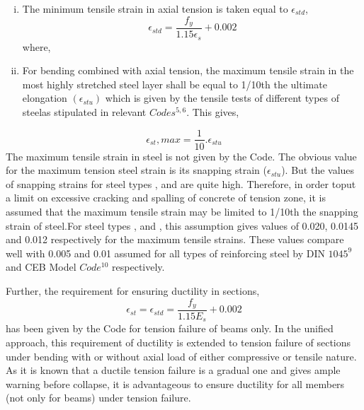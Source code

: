 \begin{enumerate}[(i)]
\item The minimum tensile strain in axial tension is taken equal to
$\epsilon_{std}$,
\begin{equation}
\epsilon_{std}=\frac{f_y}{1.15{\epsilon_s}}+0.002
\label{minimumtensilestrain}
\end{equation}
where, 
\item  For bending combined with axial tension, the maximum tensile
strain in the most highly stretched steel layer shall be equal to 1/10th
the ultimate elongation $(\epsilon_{stu})$ which is given by the tensile
tests of different types of steelas stipulated in relevant
$Codes^{5,6}$. This gives,
\end{enumerate}
\begin{equation}
\epsilon_{st},max=\frac{1}{10}.\epsilon_{stu}
\end{equation}
The maximum tensile strain in steel is not given by the Code. The obvious
value for the maximum tension steel strain is its snapping strain
($\epsilon_{stu}$). But the values of snapping strains for steel types
{\fetwofivezero}, {\fefouronefive} and {\fefivezerozero} are quite high.
Therefore, in order toput a limit on excessive cracking and spalling of
concrete of tension zone, it is assumed that the maximum tensile strain
may be limited to 1/10th the snapping strain of steel.For steel types
{\fetwofivezero}, {\fefouronefive} and {\fefivezerozero}, this assumption
gives values of 0.020, 0.0145 and 0.012 respectively for the maximum
tensile strains. These values compare well with 0.005 and 0.01 assumed for 
all types of reinforcing steel by DIN $1045^9$ and CEB Model $Code^{10}$
respectively.

Further, the requirement for ensuring ductility in sections,
$$\epsilon_{st}=\epsilon_{std}=\frac{f_y}{1.15 E_s}+0.002$$
has been given by the Code for tension failure of beams only. In the
unified approach, this requirement of ductility is extended to tension
failure of sections under bending with or without axial load of either
compressive or tensile nature. As it is known that a ductile tension
failure is a gradual one and gives ample warning before collapse, it
is advantageous to ensure ductility for all members (not only for beams) 
under tension failure.

